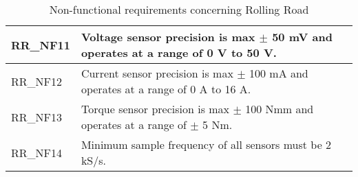 \begin{table}[h!]
\begin{tabular}{|p{2 cm}|p{10 cm}|p{2 cm}|}
		RR\_NF11
		& Voltage sensor precision is max $\pm$ 50 mV and operates at a range of 0 V to 50 V. 
		&  \\ \hline
		RR\_NF12
		& Current sensor precision is max $\pm$ 100 mA and operates at a range of 0 A to 16 A. 
		&  \\ \hline
		RR\_NF13
		& Torque sensor precision is max $\pm$ 100 Nmm and operates at a range of $\pm$ 5 Nm. 
		&  \\ \hline
		RR\_NF14
		& Minimum sample frequency of all sensors must be 2 kS/s.  
		&  \\ \hline
	\end{tabular}
	\caption{Non-functional requirements concerning Rolling Road}
\end{table}


